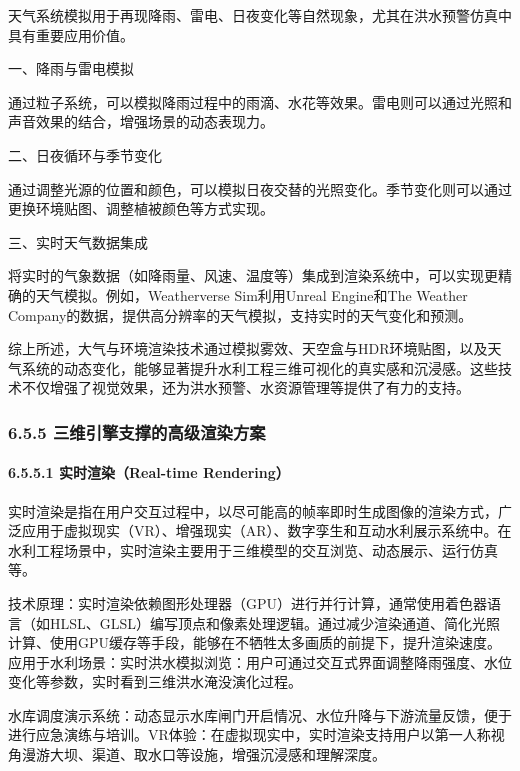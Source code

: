 天气系统模拟用于再现降雨、雷电、日夜变化等自然现象，尤其在洪水预警仿真中具有重要应用价值。

一、降雨与雷电模拟

通过粒子系统，可以模拟降雨过程中的雨滴、水花等效果。雷电则可以通过光照和声音效果的结合，增强场景的动态表现力。

二、日夜循环与季节变化

通过调整光源的位置和颜色，可以模拟日夜交替的光照变化。季节变化则可以通过更换环境贴图、调整植被颜色等方式实现。

三、实时天气数据集成

将实时的气象数据（如降雨量、风速、温度等）集成到渲染系统中，可以实现更精确的天气模拟。例如，Weatherverse Sim利用Unreal Engine和The Weather Company的数据，提供高分辨率的天气模拟，支持实时的天气变化和预测。

综上所述，大气与环境渲染技术通过模拟雾效、天空盒与HDR环境贴图，以及天气系统的动态变化，能够显著提升水利工程三维可视化的真实感和沉浸感。这些技术不仅增强了视觉效果，还为洪水预警、水资源管理等提供了有力的支持。

\hypertarget{ux4e09ux7ef4ux5f15ux64ceux652fux6491ux7684ux9ad8ux7ea7ux6e32ux67d3ux65b9ux6848}{%
\subsubsection{6.5.5 三维引擎支撑的高级渲染方案}\label{ux4e09ux7ef4ux5f15ux64ceux652fux6491ux7684ux9ad8ux7ea7ux6e32ux67d3ux65b9ux6848}}

\hypertarget{ux5b9eux65f6ux6e32ux67d3real-time-rendering}{%
\paragraph{6.5.5.1 实时渲染（Real-time Rendering）}\label{ux5b9eux65f6ux6e32ux67d3real-time-rendering}}

实时渲染是指在用户交互过程中，以尽可能高的帧率即时生成图像的渲染方式，广泛应用于虚拟现实（VR）、增强现实（AR）、数字孪生和互动水利展示系统中。在水利工程场景中，实时渲染主要用于三维模型的交互浏览、动态展示、运行仿真等。

技术原理：实时渲染依赖图形处理器（GPU）进行并行计算，通常使用着色器语言（如HLSL、GLSL）编写顶点和像素处理逻辑。通过减少渲染通道、简化光照计算、使用GPU缓存等手段，能够在不牺牲太多画质的前提下，提升渲染速度。应用于水利场景：实时洪水模拟浏览：用户可通过交互式界面调整降雨强度、水位变化等参数，实时看到三维洪水淹没演化过程。

水库调度演示系统：动态显示水库闸门开启情况、水位升降与下游流量反馈，便于进行应急演练与培训。VR体验：在虚拟现实中，实时渲染支持用户以第一人称视角漫游大坝、渠道、取水口等设施，增强沉浸感和理解深度。

